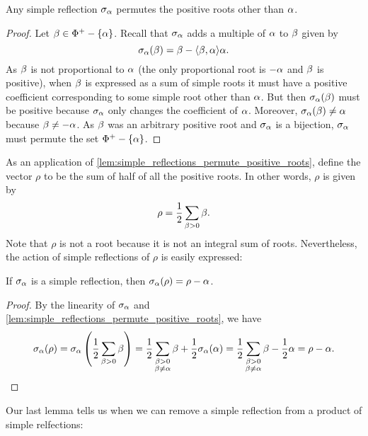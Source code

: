 \documentclass[12pt,reqno,oneside]{amsart}
\begin{document}
    \begin{lemma}\label{lem:simple_reflections_permute_positive_roots}
        Any simple reflection $\sigma_{\alpha}$ permutes the positive roots other than $\alpha$.
    \end{lemma}
    \begin{proof}
        Let $\beta \in \Phi^{+}-\{\alpha\}$. Recall that $\sigma_{\alpha}$ adds a multiple of $\alpha$ to $\beta$ given by
        \[
            \sigma_{\alpha}(\beta) = \beta-\langle\beta,\alpha\rangle\alpha.
        \]
        As $\beta$ is not proportional to $\alpha$ (the only proportional root is $-\alpha$ and $\beta$ is positive), when $\beta$ is expressed as a sum of simple roots it must have a positive coefficient corresponding to some simple root other than $\alpha$. But then $\sigma_{\alpha}(\beta)$ must be positive because $\sigma_{\alpha}$ only changes the coefficient of $\alpha$. Moreover, $\sigma_{\alpha}(\beta) \neq \alpha$ because $\beta \neq -\alpha$. As $\beta$ was an arbitrary positive root and $\sigma_{\alpha}$ is a bijection, $\sigma_{\alpha}$ must permute the set $\Phi^{+}-\{\alpha\}$.
    \end{proof}

    As an application of \cref{lem:simple_reflections_permute_positive_roots}, define the vector $\rho$ to be the sum of half of all the positive roots. In other words, $\rho$ is given by
    \[
        \rho = \frac{1}{2}\sum_{\beta > 0}\beta.
    \]
    Note that $\rho$ is not a root because it is not an integral sum of roots. Nevertheless, the action of simple reflections of $\rho$ is easily expressed:

    \begin{corollary}\label{cor:simple_reflection_on_half_sum_element}
        If $\sigma_{\alpha}$ is a simple reflection, then $\sigma_{\alpha}(\rho) = \rho-\alpha$.
    \end{corollary}
    \begin{proof}
        By the linearity of $\sigma_{\alpha}$ and \cref{lem:simple_reflections_permute_positive_roots}, we have
        \[
            \sigma_{\alpha}(\rho) = \sigma_{\alpha}\left(\frac{1}{2}\sum_{\beta > 0}\beta\right) = \frac{1}{2}\sum_{\substack{\beta > 0 \\ \beta \neq \alpha}}\beta+\frac{1}{2}\sigma_{\alpha}(\alpha) = \frac{1}{2}\sum_{\substack{\beta > 0 \\ \beta \neq \alpha}}\beta-\frac{1}{2}\alpha = \rho-\alpha.
        \]
    \end{proof}

    Our last lemma tells us when we can remove a simple reflection from a product of simple relfections:
\end{document}
